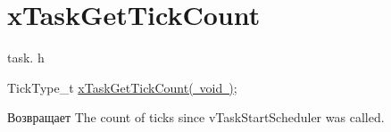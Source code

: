 \hypertarget{group__x_task_get_tick_count}{}\section{x\+Task\+Get\+Tick\+Count}
\label{group__x_task_get_tick_count}
task. h 
\begin{DoxyPre}TickType\_t \mbox{\hyperlink{task_8h_a753ecfe23e7386066ecccad5d16422f7}{xTaskGetTickCount( void )}};\end{DoxyPre}


\begin{DoxyReturn}{Возвращает}
The count of ticks since v\+Task\+Start\+Scheduler was called. 
\end{DoxyReturn}
